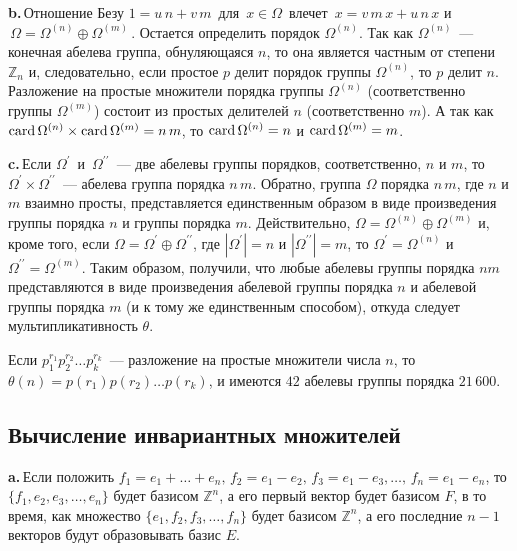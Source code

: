     {\bfseries b.\;}\,Отношение Безу $1 = u\,n + v\,m\,$ для $\,x \in \Omega\,$ влечет $\,x = v\,m\,x + u\,n\,x$ и $\,\Omega = \Omega^{(n)} \oplus \Omega^{(m)}\,$. Остается определить порядок $\Omega^{(n)}$. Так как $\Omega^{(n)}$~— конечная абелева группа, обнуляющаяся $n$, то она является
    частным от степени $\mathbb{Z}_n$ и, следовательно, если простое $p$ делит порядок группы $\Omega^{(n)}$, то $p$ делит $n$. Разложение на простые множители порядка группы $\Omega^{(n)}$ (соответственно группы $\Omega^{(m)}$) состоит из простых делителей $n$ (соответственно $m$). А так как $\operatorname{card} \Omega^{(n)} \times \operatorname{card} \Omega^{(m)} = n\,m$, то $\operatorname{card} \Omega^{(n)} = n$ и $\operatorname{card} \Omega^{(m)} = m$.

    {\bfseries c.\;}\,Если $\Omega^\prime\,$ и $\,\Omega^{\prime\prime}$~— две абелевы группы порядков, соответственно, $n$ и $m$, то $\Omega^\prime \times \Omega^{\prime\prime}$~— абелева группа порядка $n\,m$. Обратно, группа $\Omega$ порядка $n\,m$, где $n$ и $m$ взаимно просты, представляется единственным образом в виде произведения группы порядка $n$ и группы порядка $m$. Действительно, $\Omega = \Omega^{(n)} \oplus \Omega^{(m)}$ и, кроме того, если $\Omega = \Omega^\prime \oplus \Omega^{\prime\prime}$, где $|\Omega^\prime| = n$ и $|\Omega^{\prime\prime}| = m$, то $\Omega^\prime = \Omega^{(n)}$ и $\Omega^{\prime\prime} = \Omega^{(m)}$. Таким образом, получили, что любые абелевы группы порядка $nm$ представляются в виде произведения абелевой группы порядка $n$ и абелевой группы порядка $m$ (и к тому же единственным способом), откуда следует мультипликативность $\theta$.

    Если $p^{r_1}_1p^{r_2}_2 \ldots p^{r_k}_k$~— разложение на простые множители числа $n$, то \linebreak $\theta(n)=p(r_1)p(r_2) \ldots p(r_k)$, и имеются $42$ абелевы группы порядка $21\,600$.

    \subsection{\normalsize {Вычисление инвариантных множителей}}

    {\bfseries a.\;}\,Если положить $ f_1 = e_1 + \ldots + e_n,\,f_2 = e_1 - e_2,\,f_3 = e_1 - e_3, \ldots ,\,f_n = e_1 - e_n$, то $\{f_1, e_2, e_3, \ldots, e_n\}$ будет базисом $\mathbb{Z}^n$, а его первый вектор будет базисом $F$, в то время, как множество $\{e_1, f_2, f_3, \ldots, f_n\}$ будет базисом $\mathbb{Z}^n$, а его последние $n-1$ векторов будут образовывать базис $E$.

